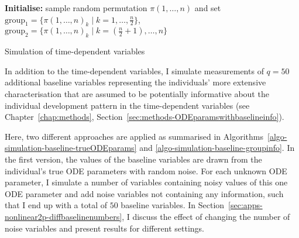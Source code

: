 \begin{algorithm}
	\SetAlgoLined
	\textbf{Initialise:} 
	sample random permutation $\pi({1,\dots, n})$ and set $\mathrm{group}_1 = \lbrace\pi({1,\dots, n})_k \mid k=1,\dots, \frac{n}{2}\rbrace$, $\mathrm{group}_2 = \lbrace\pi({1,\dots, n})_k \mid k=(\frac{n}{2}+1),\dots, n\rbrace$\; 
	\caption{Simulation of time-dependent variables}
	\label{algo-simulation-time-dependent}
\end{algorithm}

In addition to the time-dependent variables, I simulate measurements of $q=50$ additional baseline variables representing the individuals' more extensive characterisation that are assumed to be potentially informative about the individual development pattern in the time-dependent variables (see Chapter~\ref{chap:methods}, Section~\ref{sec:methods-ODEparamswithbaselineinfo}).

Here, two different approaches are applied as summarised in Algorithms~\ref{algo-simulation-baseline-trueODEparams} and \ref{algo-simulation-baseline-groupinfo}. In the first version, the values of the baseline variables are drawn from the individual's true ODE parameters with random noise. For each unknown ODE parameter, I simulate a number of variables containing noisy values of this one ODE parameter and add noise variables not containing any information, such that I end up with a total of $50$ baseline variables.  
In Section~\ref{sec:apps-nonlinear2p-diffbaselinenumbers}, I discuss the effect of changing the number of noise variables and present results for different settings. 


